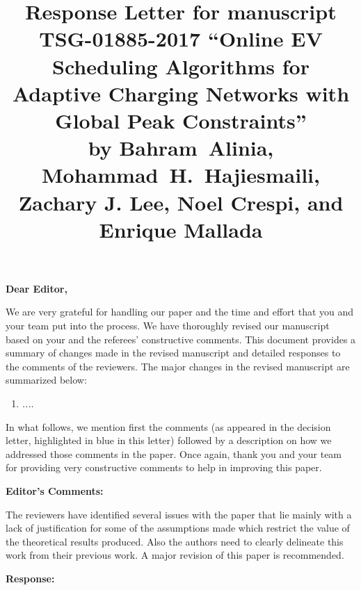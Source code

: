 \documentclass[11pt]{article}
\begin{document}
\title{Response Letter for manuscript TSG-01885-2017 ``Online EV Scheduling Algorithms for Adaptive Charging Networks with Global Peak Constraints'' \\
	\vspace{4mm} \large
	by  Bahram~Alinia, Mohammad~H.~Hajiesmaili, Zachary J. Lee, Noel Crespi, and Enrique Mallada
}

\maketitle

\textbf{Dear Editor,}

We are very grateful for handling our paper and the time and effort that you and your team put into the process. We have thoroughly revised our manuscript based on your and the referees' constructive comments. This document provides a summary of changes made in the revised manuscript and detailed responses to the comments of the reviewers. The major changes in the revised manuscript are summarized below:

\begin{enumerate}
\item \textit{...}. 


\end{enumerate}


In what follows, we mention first the comments (as appeared in the decision letter, highlighted in {\color{blue} blue} in this letter) followed by a description on how we addressed those comments in the paper. Once again, thank you and your team for providing very constructive comments to help in improving this paper.



\newpage

{\Large\textbf{Editor's Comments:}}
\vspace{3mm}

{\color{blue}The reviewers have identified several issues with the paper that lie mainly with a lack of justification for some of the assumptions made which restrict the value of the theoretical results produced. Also the authors need to clearly delineate this work from their previous work. A major revision of this paper is recommended.}

\vspace{5mm}
\noindent\textbf{Response:}
\end{document}
